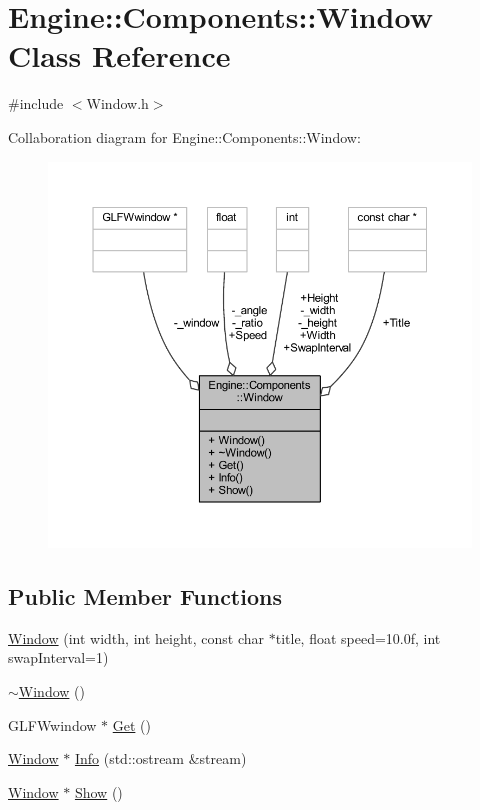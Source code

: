 \hypertarget{classEngine_1_1Components_1_1Window}{}\section{Engine\+:\+:Components\+:\+:Window Class Reference}
\label{classEngine_1_1Components_1_1Window}


{\ttfamily \#include $<$Window.\+h$>$}



Collaboration diagram for Engine\+:\+:Components\+:\+:Window\+:
\nopagebreak
\begin{figure}[H]
\begin{center}
\leavevmode
\includegraphics[width=350pt]{classEngine_1_1Components_1_1Window__coll__graph}
\end{center}
\end{figure}
\subsection*{Public Member Functions}
\begin{DoxyCompactItemize}
\item 
\mbox{\hyperlink{classEngine_1_1Components_1_1Window_aa88c443e1b4cb90949aace6e1150305b}{Window}} (int width, int height, const char $\ast$title, float speed=10.\+0f, int swap\+Interval=1)
\item 
\mbox{\hyperlink{classEngine_1_1Components_1_1Window_a5f4bd958811d789d9380dd06a359163c}{$\sim$\+Window}} ()
\item 
G\+L\+F\+Wwindow $\ast$ \mbox{\hyperlink{classEngine_1_1Components_1_1Window_a4d5c3ff7df28f77bfa330beb447512f8}{Get}} ()
\item 
\mbox{\hyperlink{classEngine_1_1Components_1_1Window}{Window}} $\ast$ \mbox{\hyperlink{classEngine_1_1Components_1_1Window_a2fbf92d20aae2e10273b15ad43cc8db8}{Info}} (std\+::ostream \&stream)
\item 
\mbox{\hyperlink{classEngine_1_1Components_1_1Window}{Window}} $\ast$ \mbox{\hyperlink{classEngine_1_1Components_1_1Window_adddcf28e753f81571ba39b4d8f698ada}{Show}} ()
\end{DoxyCompactItemize}
